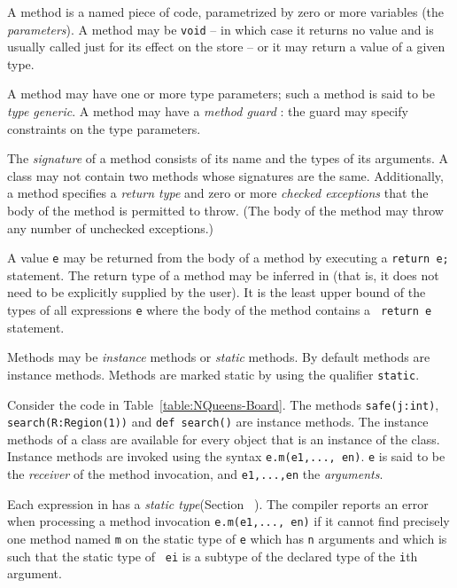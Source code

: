 A method is a named piece of code, parametrized by zero or more
variables (the {\em parameters}). A method may be {\tt void} -- in
which case it returns no value and is usually called just for its
effect on the store -- or it may return a value of a given type. 

A method may have one or more type parameters; such a method is said
to be {\em type generic}. A method may have a {\em method guard }: the
guard may specify constraints on the type parameters. 


The {\em signature} of a method consists of its name and the types of
its arguments. A class may not contain two methods whose signatures
are the same. Additionally, a method specifies a {\em return type} and
zero or more {\em checked exceptions} that the body of the method is
permitted to throw. (The body of the method may throw any number of
unchecked exceptions.)


A value {\tt e} may be returned from the body of a method by executing
a {\tt return e;} statement.  The return type of a method may be
inferred in \Xten{} (that is, it does not need to be explicitly
supplied by the user).  It is the least upper bound of the types of
all expressions {\tt e} where the body of the method contains a {\tt
return e} statement.

Methods may be {\em instance} methods or {\em static} methods. 
By default methods are instance methods. Methods are marked static by using 
the qualifier {\tt static}.

Consider the code in Table~\ref{table:NQueens-Board}.  The methods
{\tt safe(j:int)}, {\tt search(R:Region(1))} and {\tt def search()}
are instance methods.  The instance methods of a class are available
for every object that is an instance of the class.  Instance methods
are invoked using the syntax {\tt e.m(e1,..., en)}.  {\tt e} is said
to be the {\em receiver} of the method invocation, and {\tt e1,...,en}
the {\em arguments}.

Each expression in \Xten{} has a {\em static type}(Section
~).  The compiler reports an error when
processing a method invocation {\tt e.m(e1,..., en)} if it cannot find
precisely one method named {\tt m} on the static type of {\tt e} which
has {\tt n} arguments and which is such that the static type of {\tt
  ei} is a subtype of the declared type of the {\tt i}th argument.


